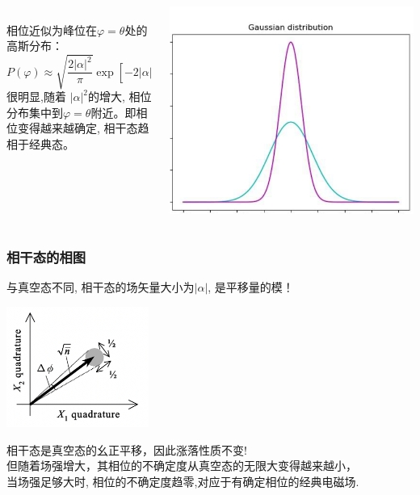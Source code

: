\begin{frame}
\frametitle{}
\begin{columns}
    \begin{column}[t]{0.6\linewidth}
        ~\\
    相位近似为峰位在$\varphi = \theta$处的高斯分布：
        \[ P(\varphi) \approx \sqrt{\frac{2 \left|\alpha\right|^2}{\pi}} \exp[-2\left|\alpha\right|^2(\varphi - \theta)^2]\]
   很明显,随着 $\left|\alpha\right|^2$的增大, 相位分布集中到$\varphi = \theta$附近。即相位变得越来越确定, 相干态趋相于经典态。
    \end{column}
    \begin{column}[t]{0.4\linewidth} 
          \begin{center}
               \includegraphics[width=1.0\textwidth]{figs/33.png} 
          \end{center} 
    \end{column} 
\end{columns} 
\end{frame}

\begin{frame}
      \frametitle{相干态的相图}
    与真空态不同, 相干态的场矢量大小为$\left|\alpha\right|$, 是平移量的模！ 
   \begin{center}
        \includegraphics[width=0.35\textwidth]{figs/13.png}
   \end{center}
   相干态是真空态的幺正平移，因此涨落性质不变!\\ 
   但随着场强增大，其相位的不确定度从真空态的无限大变得越来越小，\\ 当场强足够大时, 相位的不确定度趋零,对应于有确定相位的经典电磁场.
\end{frame}

